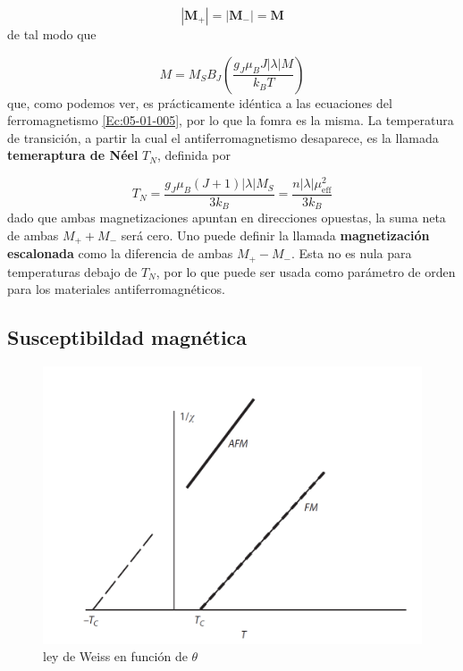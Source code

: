 \documentclass[12pt,a4paper]{book}
\numberwithin{equation}{section}
\numberwithin{figure}{section}
\newcommand{\parentesis}[1]{\left( #1  \right)}
\newcommand{\eff}{\mathrm{eff}}
\newcommand{\Mn}{\mathbf{M}}
\begin{document}
\begin{equation}
    |\Mn_+|=|\Mn_-| = \Mn
\end{equation}
de tal modo que

\begin{equation}
    M = M_S B_J \parentesis{\frac{g_J \mu_B J |\lambda| M}{k_B T}}
\end{equation}
que, como podemos ver, es prácticamente idéntica a las ecuaciones del ferromagnetismo \ref{Ec:05-01-005}, por lo que la fomra es la misma. La temperatura de transición, a partir la cual el antiferromagnetismo desaparece, es la llamada \textbf{temeraptura de Néel} $T_N$, definida por

\begin{equation}
    T_N = \frac{g_J \mu_B (J+1) |\lambda|M_S}{3k_B} = \frac{n |\lambda|\mu^2_{\eff}}{3k_B} \label{Ec:05-02-005}
\end{equation}
dado que ambas magnetizaciones apuntan en direcciones opuestas, la suma neta de ambas $M_+ + M_-$ será cero. Uno puede definir la llamada \textbf{magnetización escalonada} como la diferencia de ambas $M_+-M_-$. Esta no es nula para temperaturas debajo de $T_N$, por lo que puede ser usada como parámetro de orden para los materiales antiferromagnéticos. 

\subsection{Susceptibildad magnética}

\begin{figure}[t]
    \centering
    \includegraphics[scale=0.5]{05-LeyWeiss.png}
    \caption{ley de Weiss en función de $\theta$}
    \label{Fig:05-02-02}
\end{figure}
\end{document}
